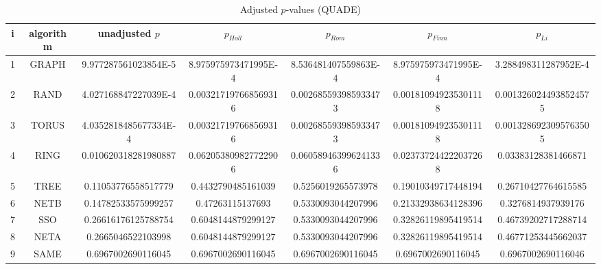 \documentclass[a4paper,10pt]{article}
\begin{document}
\begin{landscape}
\begin{table}[!htp]
\centering\scriptsize
\caption{Adjusted $p$-values (QUADE)}
\begin{tabular}{ccccccc}
i&algorithm&unadjusted $p$&$p_{Holl}$&$p_{Rom}$&$p_{Finn}$&$p_{Li}$\\
\hline
1& GRAPH&9.977287561023854E-5&8.975975973471995E-4&8.536481407559863E-4&8.975975973471995E-4&3.288498311287952E-4\\
2& RAND&4.027168847227039E-4&0.003217197668569316&0.002685593985933473&0.001810949235301118&0.0013260244938524575\\
3& TORUS&4.0352818485677334E-4&0.003217197668569316&0.002685593985933473&0.001810949235301118&0.0013286923095763505\\
4& RING&0.010620318281980887&0.062053809827722906&0.060589463996241336&0.023737244222037268&0.03383128381466871\\
5& TREE&0.11053776558517779&0.4432790485161039&0.5256019265573978&0.19010349717448194&0.26710427764615585\\
6& NETB&0.14782533575999257&0.47263115137693&0.5330093044207996&0.21332938634128396&0.3276814937939176\\
7& SSO&0.26616176125788754&0.6048144879299127&0.5330093044207996&0.32826119895419514&0.46739202717288714\\
8& NETA&0.2665046522103998&0.6048144879299127&0.5330093044207996&0.32826119895419514&0.46771253445662037\\
9& SAME&0.6967002690116045&0.6967002690116045&0.6967002690116045&0.6967002690116045&0.6967002690116046\\
\hline
\end{tabular}
\end{table}

\end{landscape}
\end{document}
